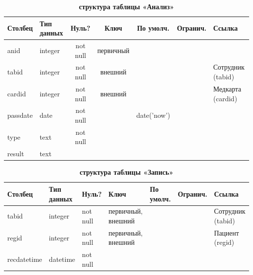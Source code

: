 \documentclass[14pt,a4paper,russian]{extreport}
\begin{document}
\begin{table}[h]
    \caption{ } 
    \begin{subtable}[t]{\textwidth}
        \caption{\textbf{структура таблицы «Анализ»}}
    \begin{tabularx}{\textwidth}{| X | X | c | c | c | c | X |}
        \hline
        \textbf{Столбец} & \textbf{Тип данных} & \textbf{Нуль?} & \textbf{Ключ} & \textbf{По
        умолч.} & \textbf{Огранич.} & \textbf{Ссылка} \\ \hline
        anid & integer & not null & первичный & & & \\ \hline
        tabid & integer & not null & внешний & & & Сотрудник (tabid) \\ \hline
        cardid & integer & not null & внешний & & & Медкарта (cardid) \\ \hline
        passdate & date & not null & & date('now') & & \\ \hline
        type & text & not null & & & & \\ \hline
        result & text & & & & & \\ \hline
    \end{tabularx}
    \end{subtable}
    \label{table:analysis}
\end{table}

\begin{table}[h]
    \caption{ } 
    \begin{subtable}[t]{\textwidth}
        \caption{\textbf{структура таблицы «Запись»}}
    \begin{tabularx}{\textwidth}{| X | X | X | X | X | X | X |}
        \hline
        \textbf{Столбец} & \textbf{Тип данных} & \textbf{Нуль?} & \textbf{Ключ} & \textbf{По
        умолч.} & \textbf{Огранич.} & \textbf{Ссылка} \\ \hline
        tabid & integer & not null & первичный, внешний & & & Сотрудник (tabid) \\ \hline
        regid & integer & not null & первичный, внешний & & & Пациент (regid)  \\ \hline
        recdatetime & datetime & not null & & & & \\ \hline
    \end{tabularx}
    \end{subtable}
    \label{table:rec}
\end{table}
\end{document}
